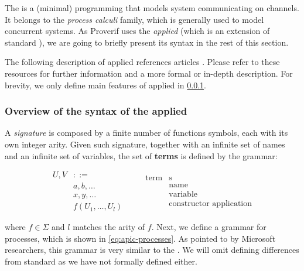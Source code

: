The \pic \cite{pi-calculus-book} is a (minimal) programming that models system communicating on channels. It belongs to the \textit{process calculi} family, which is generally used to model concurrent systems. As Proverif uses the \textit{applied} \pic (which is an extension of standard \picnospace), we are going to briefly present its syntax in the rest of this section.

The following description of applied \pic references articles \cite{applied-pi-calculus-private-auth, applied-pi-calculus-abadi-1, applied-pi-calculus-abadi-2}. Please refer to these resources for further information and a more formal or in-depth description. For brevity, we only define main features of applied \pic in \cref{subsub:syntax-apic}.

\subsubsection{Overview of the syntax of the applied \pic}
\label{subsub:syntax-apic}

A \textit{signature \textSigma} is composed by a finite number of functions symbols, each with its own integer arity. Given such signature, together with an infinite set of names and an infinite set of variables, the set of \textbf{terms} is defined by the grammar:

\begin{equation}
\label{eq:apic-terms}
\begin{aligned}
    U, V &::=\\
    &a, b, \dots\\
    &x, y, \dots\\
    &f\left(U_1, \dots, U_l\right)
\end{aligned}
\qquad
\begin{aligned}
    \mbox{term}&\mbox{s}\\
    &\mbox{name}\\
    &\mbox{variable}\\
    &\mbox{constructor application}
\end{aligned}
\end{equation}

where $f \in \Sigma$ and $l$ matches the arity of $f$. Next, we define a grammar for processes, which is shown in \cref{eq:apic-processes}. As pointed to by Microsoft researchers, this grammar is very similar to the \pic \cite{applied-pi-calculus-private-auth}. We will omit defining differences from standard \pic as we have not formally defined \pic either.


